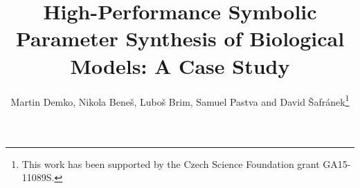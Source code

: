 \documentclass{llncs}
\begin{document}
\frontmatter          %
\pagestyle{headings}  %

\mainmatter
\title{High-Performance Symbolic Parameter Synthesis of Biological Models: A Case Study}

\author{Martin Demko, Nikola Bene\v{s}, Lubo\v{s} Brim, Samuel Pastva and David {\v{S}}afr\'{a}nek\thanks{This work has been supported by the Czech Science Foundation grant GA15-11089S.}}
\end{document}
